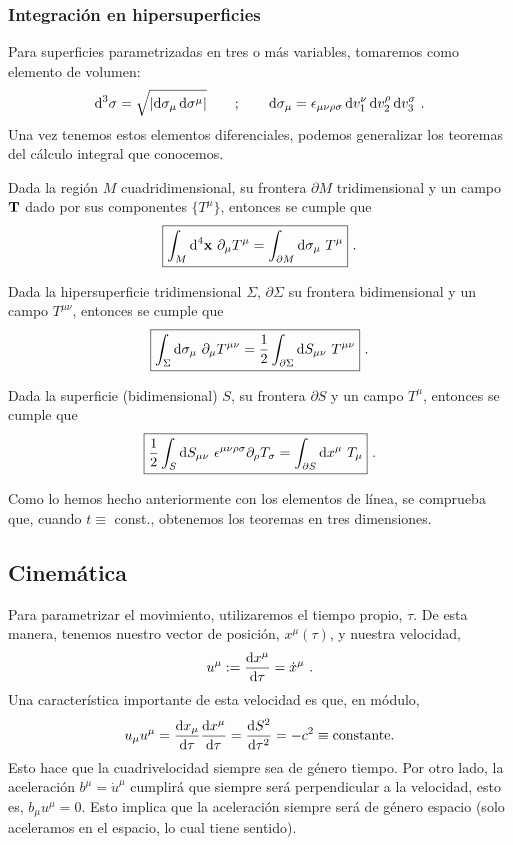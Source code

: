 \subsubsection{Integración en hipersuperficies}
Para superficies parametrizadas en tres o más variables, tomaremos como elemento de volumen:
$$
\D[3]{\sigma } = \sqrt{\left | \D{\sigma_\mu , \sigma ^\mu } \right |} \qquad ; \qquad \D{\sigma}_\mu = \epsilon_{\mu \nu \rho \sigma } \D{v_1^\nu , v_2^\rho , v_3^\sigma } \ .
$$
Una vez tenemos estos elementos diferenciales, podemos generalizar los teoremas del cálculo integral que conocemos.
\begin{theorem}
     Dada la región $M$ cuadridimensional, su frontera $\partial M$ tridimensional y un campo $\mathbf{T}$ dado por sus componentes $\{ T^\mu \}  $, entonces se cumple que
    $$
    \boxed{\int_M \D[4]{\B{x}} \ \partial_\mu T^\mu = \int_{\partial M}\D{\sigma_\mu } \ T^\mu} \ .
    $$
\end{theorem}
\begin{theorem}
    Dada la hipersuperficie tridimensional $\Sigma $, $\partial \Sigma $ su frontera bidimensional y un campo $T^{\mu \nu }$, entonces se cumple que
    $$
    \boxed{\int_\Sigma \D{\sigma_\mu } \ \partial_\mu T^{\mu \nu } = \frac{1}{2} \int_{\partial \Sigma } \D{S_{\mu \nu} } \ T^{\mu \nu }} \ .
    $$
\end{theorem}
\begin{theorem}
     Dada la superficie (bidimensional) $S$, su frontera $\partial S$ y un campo $T^\mu $, entonces se cumple que
    $$
    \boxed{\frac{1}{2} \int _S \D{S_{\mu \nu }} \ \epsilon^{\mu \nu \rho \sigma } \partial_\rho T_\sigma = \int_{\partial S} \D{x^\mu } \ T_\mu} \ . 
    $$
\end{theorem}
Como lo hemos hecho anteriormente con los elementos de línea, se comprueba que, cuando $t\equiv $ const., obtenemos los teoremas en tres dimensiones.
\subsection{Cinemática}
Para parametrizar el movimiento, utilizaremos el tiempo propio, $\tau$. De esta manera, tenemos nuestro vector de posición, $x^\mu (\tau)$, y nuestra velocidad, 
$$
u^\mu := \dv{x^\mu }{\tau } = \dot{x}^\mu \ .
$$
Una característica importante de esta velocidad es que, en módulo, 
$$
u_\mu u^\mu = \dv{x_\mu }{\tau} \dv{x^\mu }{\tau } = \dv{S^2}{\tau^2 } = -c^2 \equiv \text{constante.}
$$
Esto hace que la cuadrivelocidad siempre sea de género tiempo. Por otro lado, la aceleración $b^\mu = \dot{u}^\mu $ cumplirá que siempre será perpendicular a la velocidad, esto es, $b_\mu u^\mu = 0$. Esto implica que la aceleración siempre será de género espacio (solo aceleramos en el espacio, lo cual tiene sentido). \\

